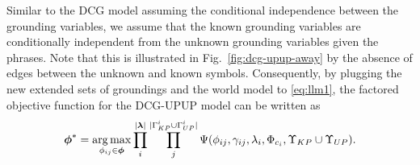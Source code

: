 Similar to the DCG model assuming the conditional independence between the grounding variables, we assume that the known grounding variables are conditionally independent from the unknown grounding variables given the phrases. Note that this is illustrated in Fig.~\ref{fig:dcg-upup-away} by the absence of edges between the unknown and known symbols. Consequently, by plugging the new extended sets of groundings and the world model to \eqref{eq:llm1}, the factored  objective function for the DCG-UPUP model can be written as
\begin{equation}
\boldsymbol{\phi}^* = \operatorname*{\arg\max}_{\phi_{ij} \in \boldsymbol{\phi}} \prod_{i}^{|\boldsymbol\lambda|} \prod_{j}^{|\Gamma^i_{KP} \cup \Gamma^i_{UP}|} \Psi(\phi_{ij},\gamma_{ij},\lambda_i, \Phi_{c_{i}},\Upsilon_{KP} \cup \Upsilon_{UP}).
\label{eq:dcg_upup_llm1}
\end{equation}

